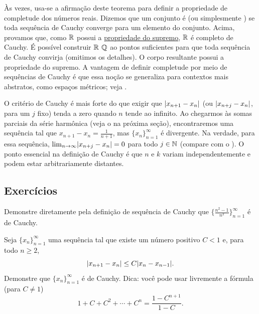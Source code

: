 \begin{remark}
Às vezes, usa-se a afirmação deste teorema para definir a propriedade de
completude dos números reais. Dizemos que um conjunto é
\emph{} (ou simplesmente \emph{})
se toda sequência de Cauchy converge para um elemento do conjunto.
Acima, provamos que, como ${\mathbb{R}}$ possui a \hyperref[defn:lub]{propriedade do supremo},
${\mathbb{R}}$ é completo de Cauchy.
É possível construir ${\mathbb{R}}$  ${\mathbb{Q}}$ ao  pontos
suficientes para que toda sequência de Cauchy convirja (omitimos os detalhes).
O corpo resultante possui a propriedade do supremo.
A vantagem de definir completude por meio de sequências de Cauchy é que essa
noção se generaliza para contextos mais abstratos, como espaços métricos; veja
.
\end{remark}

O critério de Cauchy é mais forte do que exigir que
$\lvert {x_{n+1}-x_n} \rvert$ (ou $\lvert {x_{n+j}-x_n} \rvert$, para um $j$ fixo) tenda a zero quando
$n$ tende ao infinito. Ao chegarmos às somas parciais da série harmônica
(veja o  na próxima seção), encontraremos
uma sequência tal que $x_{n+1}-x_n = \frac{1}{n+1}$,
mas $\{ x_n \}_{n=1}^\infty$ é divergente.
Na verdade, para essa sequência,
$\lim_{n\to\infty} \lvert {x_{n+j}-x_n} \rvert = 0$ para
todo $j \in {\mathbb{N}}$ (compare com o ).
O ponto essencial na definição de Cauchy é que $n$ e $k$
variam independentemente e podem estar arbitrariamente distantes.

\subsection{Exercícios}

\begin{exercise}
Demonstre diretamente pela definição de sequência de Cauchy que $\bigl\{ \frac{n^2-1}{n^2} \bigr\}_{n=1}^\infty$ é de Cauchy.
\end{exercise}

\begin{exercise}
Seja $\{ x_n \}_{n=1}^\infty$ uma sequência tal que existe um número positivo $C < 1$ e, para todo $n \geq 2$,
\begin{equation*}
\lvert {x_{n+1} - x_n} \rvert \leq C \lvert {x_{n}-x_{n-1}} \rvert .
\end{equation*}
Demonstre que $\{ x_n \}_{n=1}^\infty$ é de Cauchy.
Dica: você pode usar livremente a fórmula (para $C \neq 1$)
\begin{equation*}
1+ C+ C^2 + \cdots + C^n = \frac{1-C^{n+1}}{1-C}.
\end{equation*}
\end{exercise}

